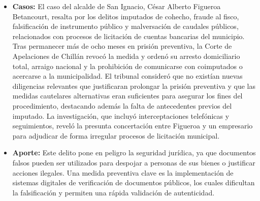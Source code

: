 \documentclass[letter,12pt]{article}
\begin{document}
\begin{itemize}
			\item \textbf{Casos: }El caso del alcalde de San Ignacio, César Alberto Figueroa Betancourt, resalta por los delitos imputados de cohecho, fraude al fisco, falsificación de instrumento público y malversación de caudales públicos, relacionados con procesos de licitación de cuentas bancarias del municipio. Tras permanecer más de ocho meses en prisión preventiva, la Corte de Apelaciones de Chillán revocó la medida y ordenó su arresto domiciliario total, arraigo nacional y la prohibición de comunicarse con coimputados o acercarse a la municipalidad. El tribunal consideró que no existían nuevas diligencias relevantes que justificaran prolongar la prisión preventiva y que las medidas cautelares alternativas eran suficientes para asegurar los fines del procedimiento, destacando además la falta de antecedentes previos del imputado. La investigación, que incluyó interceptaciones telefónicas y seguimientos, reveló la presunta concertación entre Figueroa y un empresario para adjudicar de forma irregular procesos de licitación municipal.\cite{Falsificacion}\\
		
		\item \textbf{Aporte: }Este delito pone en peligro la seguridad jurídica, ya que documentos falsos pueden ser utilizados para despojar a personas de sus bienes o justificar acciones ilegales. Una medida preventiva clave es la implementación de sistemas digitales de verificación de documentos públicos, los cuales dificultan la falsificación y permiten una rápida validación de autenticidad.\\
	\end{itemize}
	
\end{document}

